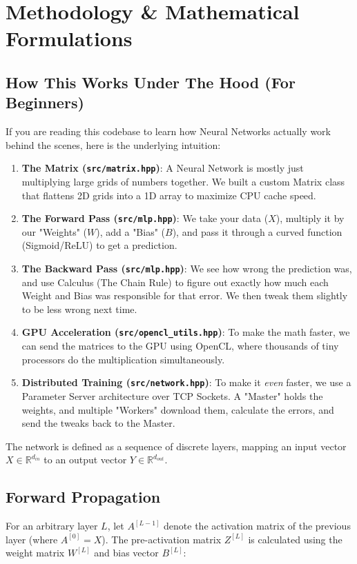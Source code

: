 \documentclass[11pt, a4paper]{article}
\begin{document}
\section{Methodology \& Mathematical Formulations}

\subsection*{How This Works Under The Hood (For Beginners)}
If you are reading this codebase to learn how Neural Networks actually work behind the scenes, here is the underlying intuition:
\begin{enumerate}
    \item \textbf{The Matrix (\texttt{src/matrix.hpp})}: A Neural Network is mostly just multiplying large grids of numbers together. We built a custom Matrix class that flattens 2D grids into a 1D array to maximize CPU cache speed.
    \item \textbf{The Forward Pass (\texttt{src/mlp.hpp})}: We take your data ($X$), multiply it by our "Weights" ($W$), add a "Bias" ($B$), and pass it through a curved function (Sigmoid/ReLU) to get a prediction.
    \item \textbf{The Backward Pass (\texttt{src/mlp.hpp})}: We see how wrong the prediction was, and use Calculus (The Chain Rule) to figure out exactly how much each Weight and Bias was responsible for that error. We then tweak them slightly to be less wrong next time.
    \item \textbf{GPU Acceleration (\texttt{src/opencl\_utils.hpp})}: To make the math faster, we can send the matrices to the GPU using OpenCL, where thousands of tiny processors do the multiplication simultaneously.
    \item \textbf{Distributed Training (\texttt{src/network.hpp})}: To make it \textit{even} faster, we use a Parameter Server architecture over TCP Sockets. A "Master" holds the weights, and multiple "Workers" download them, calculate the errors, and send the tweaks back to the Master.
\end{enumerate}

The network is defined as a sequence of discrete layers, mapping an input vector $X \in \mathbb{R}^{d_{in}}$ to an output vector $Y \in \mathbb{R}^{d_{out}}$. 

\subsection{Forward Propagation}
For an arbitrary layer $L$, let $A^{[L-1]}$ denote the activation matrix of the previous layer (where $A^{[0]} = X$). The pre-activation matrix $Z^{[L]}$ is calculated using the weight matrix $W^{[L]}$ and bias vector $B^{[L]}$:
\end{document}
